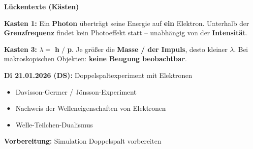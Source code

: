\documentclass[11pt,a4paper]{article}
\begin{document}
\textbf{Lückentexte (Kästen)}

\vspace{0.3em}

\begin{tcolorbox}[infobox]
\textbf{Kasten 1:} Ein \textbf{Photon} überträgt seine Energie auf \textbf{ein} Elektron. Unterhalb der \textbf{Grenzfrequenz} findet kein Photoeffekt statt -- unabhängig von der \textbf{Intensität}.

\vspace{0.3em}
\textbf{Kasten 3:} $\lambda = $ \textbf{h} $/$ \textbf{p}. Je größer die \textbf{Masse / der Impuls}, desto kleiner $\lambda$. Bei makroskopischen Objekten: \textbf{keine Beugung beobachtbar}.
\end{tcolorbox}

\vspace{0.5em}


\begin{tcolorbox}[lehrerbox={Ausblick nächste Stunde}]
\textbf{Di 21.01.2026 (DS):} Doppelspaltexperiment mit Elektronen

\begin{itemize}[nosep]
\item Davisson-Germer / Jönsson-Experiment
\item Nachweis der Welleneigenschaften von Elektronen
\item Welle-Teilchen-Dualismus
\end{itemize}

\textbf{Vorbereitung:} Simulation Doppelspalt vorbereiten
\end{tcolorbox}
\end{document}
